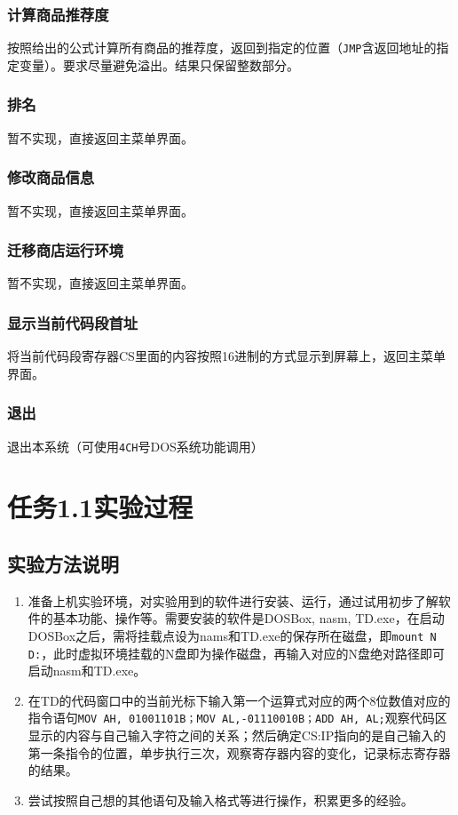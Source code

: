 \documentclass{ctexrep}
\begin{document}
\subsubsection{计算商品推荐度}
按照给出的公式计算所有商品的推荐度，返回到指定的位置（\texttt{JMP}含返回地址的指定变量）。要求尽量避免溢出。结果只保留整数部分。

\subsubsection{排名}
暂不实现，直接返回主菜单界面。
\subsubsection{修改商品信息}
暂不实现，直接返回主菜单界面。
\subsubsection{迁移商店运行环境}
暂不实现，直接返回主菜单界面。
\subsubsection{显示当前代码段首址}
将当前代码段寄存器CS里面的内容按照16进制的方式显示到屏幕上，返回主菜单界面。
\subsubsection{退出}
退出本系统（可使用\texttt{4CH}号DOS系统功能调用）

\section{任务1.1实验过程}
\subsection{实验方法说明}
\begin{enumerate}
    \item 准备上机实验环境，对实验用到的软件进行安装、运行，通过试用初步了解软件的基本功能、操作等。需要安装的软件是DOSBox, nasm, TD.exe，在启动DOSBox之后，需将挂载点设为nams和TD.exe的保存所在磁盘，即\texttt{mount N D:}，此时虚拟环境挂载的N盘即为操作磁盘，再输入对应的N盘绝对路径即可启动nasm和TD.exe。
    \item 在TD的代码窗口中的当前光标下输入第一个运算式对应的两个8位数值对应的指令语句\texttt{MOV AH, 01001101B；MOV AL,-01110010B；ADD AH, AL;}观察代码区显示的内容与自己输入字符之间的关系；然后确定CS:IP指向的是自己输入的第一条指令的位置，单步执行三次，观察寄存器内容的变化，记录标志寄存器的结果。
    \item 尝试按照自己想的其他语句及输入格式等进行操作，积累更多的经验。
\end{enumerate}
\end{document}
